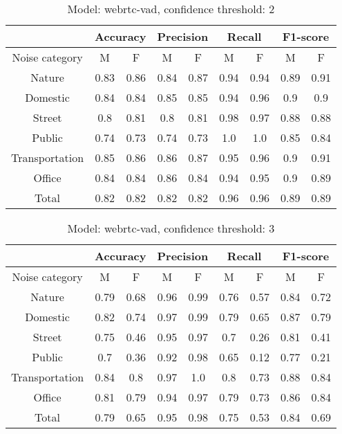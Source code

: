 \documentclass[../main.tex]{subfiles}
\begin{document}
    \begin{table}[H]
    \centering
    \small
    \begin{tabular}{ |c|c|c|c|c|c|c|c|c| }
    \hline
     &\multicolumn{2}{|c|}{Accuracy}&\multicolumn{2}{|c|}{Precision}&\multicolumn{2}{|c|}{Recall}&\multicolumn{2}{|c|}{F1-score} \\ 
    \hline
    Noise category & M & F & M & F & M & F & M & F \\ 
    \hline
    Nature & 0.83 & 0.86 & 0.84 & 0.87 & 0.94 & 0.94 & 0.89 & 0.91 \\ 
    Domestic & 0.84 & 0.84 & 0.85 & 0.85 & 0.94 & 0.96 & 0.9 & 0.9 \\ 
    Street & 0.8 & 0.81 & 0.8 & 0.81 & 0.98 & 0.97 & 0.88 & 0.88 \\ 
    Public & 0.74 & 0.73 & 0.74 & 0.73 & 1.0 & 1.0 & 0.85 & 0.84 \\ 
    Transportation & 0.85 & 0.86 & 0.86 & 0.87 & 0.95 & 0.96 & 0.9 & 0.91 \\ 
    Office & 0.84 & 0.84 & 0.86 & 0.84 & 0.94 & 0.95 & 0.9 & 0.89 \\ 
    Total & 0.82 & 0.82 & 0.82 & 0.82 & 0.96 & 0.96 & 0.89 & 0.89 \\ 
    \hline
    \end{tabular}
    \caption{Model: webrtc-vad, confidence threshold: 2}
    \end{table}
    
    \begin{table}[H]
    \centering
    \small
    \begin{tabular}{ |c|c|c|c|c|c|c|c|c| }
    \hline
     &\multicolumn{2}{|c|}{Accuracy}&\multicolumn{2}{|c|}{Precision}&\multicolumn{2}{|c|}{Recall}&\multicolumn{2}{|c|}{F1-score} \\ 
    \hline
    Noise category & M & F & M & F & M & F & M & F \\ 
    \hline
    Nature & 0.79 & 0.68 & 0.96 & 0.99 & 0.76 & 0.57 & 0.84 & 0.72 \\ 
    Domestic & 0.82 & 0.74 & 0.97 & 0.99 & 0.79 & 0.65 & 0.87 & 0.79 \\ 
    Street & 0.75 & 0.46 & 0.95 & 0.97 & 0.7 & 0.26 & 0.81 & 0.41 \\ 
    Public & 0.7 & 0.36 & 0.92 & 0.98 & 0.65 & 0.12 & 0.77 & 0.21 \\ 
    Transportation & 0.84 & 0.8 & 0.97 & 1.0 & 0.8 & 0.73 & 0.88 & 0.84 \\ 
    Office & 0.81 & 0.79 & 0.94 & 0.97 & 0.79 & 0.73 & 0.86 & 0.84 \\ 
    Total & 0.79 & 0.65 & 0.95 & 0.98 & 0.75 & 0.53 & 0.84 & 0.69 \\ 
    \hline
    \end{tabular}
    \caption{Model: webrtc-vad, confidence threshold: 3}
    \end{table}
\end{document}
